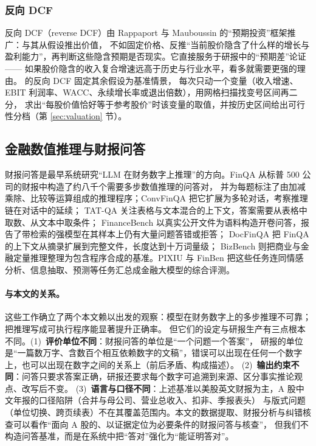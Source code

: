 \subsubsection{反向 DCF}
反向 DCF（reverse DCF）由 Rappaport 与 Mauboussin 的“预期投资”框架推广\cite{rappaport2001expectations}：与其从假设推出价值，
不如固定价格、反推“当前股价隐含了什么样的增长与盈利能力”，再判断这些隐含预期是否现实。它直接服务于研报中的“预期差”论证——
如果股价隐含的收入复合增速远高于历史与行业水平，看多就需要更强的理由。\sysname{} 的反向 DCF 固定其余假设为基准情景，
每次只动一个变量（收入增速、EBIT 利润率、WACC、永续增长率或退出倍数），用网格扫描找变号区间再二分，
求出“每股价值恰好等于参考股价”时该变量的取值，并按历史区间给出可行性分档（第 \ref{sec:valuation} 节）。

\subsection{金融数值推理与财报问答}
\label{sec:rel-finqa}

财报问答是最早系统研究“LLM 在财务数字上推理”的方向。FinQA\cite{chen2021finqa} 从标普 500 公司的财报中构造了约八千个需要多步数值推理的问答对，
并为每题标注了由加减乘除、比较等运算组成的推理程序；ConvFinQA\cite{chen2022convfinqa} 把它扩展为多轮对话，考察推理链在对话中的延续；
TAT-QA\cite{zhu2021tatqa} 关注表格与文本混合的上下文，答案需要从表格中取数、从文本中取条件；
FinanceBench\cite{islam2023financebench} 以真实公开文件为语料构造开卷问答，报告了带检索的强模型在其样本上仍有大量问题答错或拒答；
DocFinQA\cite{reddy2024docfinqa} 把 FinQA 的上下文从摘录扩展到完整文件，长度达到十万词量级；
BizBench\cite{koncel2024bizbench} 则把商业与金融定量推理整理为包含程序合成的基准。PIXIU\cite{xie2023pixiu} 与 FinBen\cite{xie2024finben}
把这些任务连同情感分析、信息抽取、预测等任务汇总成金融大模型的综合评测。

\paragraph{与本文的关系。}
这些工作确立了两个本文赖以出发的观察：模型在财务数字上的多步推理不可靠；把推理写成可执行程序能显著提升正确率。
但它们的设定与研报生产有三点根本不同。(1)~\textbf{评价单位不同}：财报问答的单位是“一个问题一个答案”，
研报的单位是“一篇数万字、含数百个相互依赖数字的文稿”，错误可以出现在任何一个数字上，也可以出现在数字之间的关系上（前后矛盾、构成描述）。
(2)~\textbf{输出约束不同}：问答只要求答案正确，研报还要求每个数字可追溯到来源、区分事实推论观点、改写后不变。
(3)~\textbf{语言与口径不同}：上述基准以美股英文财报为主，A 股中文年报的口径陷阱（合并与母公司、营业总收入、扣非、季报表头）
与版式问题（单位切换、跨页续表）不在其覆盖范围内。本文的数据提取、财报分析与纠错核查可以看作“面向 A 股的、以证据定位为必要条件的财报问答与核查”，
但我们不构造问答基准，而是在系统中把“答对”强化为“能证明答对”。

